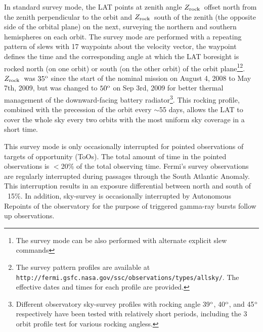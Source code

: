 \documentclass[aps,twocolumn,prd,superscriptaddress,showpacs,nofootinbib,fixfloat]{revtex4}
\newcommand{\degree}{^{\rm o}}
\newcommand{\zrock}{$Z_{\rm rock}$}
\begin{document}
In standard survey mode, the LAT points at zenith angle
\zrock\ offset north from the zenith perpendicular to the
orbit and \zrock\ south of the zenith (the opposite side of
the orbital plane) on the next, surveying the northern and
southern hemispheres on each orbit. The survey mode are
performed with a repeating pattern of slews with 17
waypoints about the velocity vector, the waypoint defines
the time and the corresponding angle at which the LAT
boresight is rocked north (on one orbit) or south (on the
other orbit) of the orbit plane\footnote{The survey mode can
be also performed with alternate explicit slew
commands}\footnote{The survey pattern profiles are available
at
\texttt{http://fermi.gsfc.nasa.gov/ssc/observations/types/allsky/}.
The effective dates and times for each profile are
provided. }. \zrock\ was $35\degree$ since the start of the
nominal mission on August 4, 2008 to May 7th, 2009, but was
changed to $50\degree$ on Sep 3rd, 2009 for better thermal
management of the downward-facing battery
radiator\footnote{Different observatory sky-survey profiles
with rocking angle 39$\degree$, 40$\degree$, and 45$\degree$
respectively have been tested with relatively short periods,
including the 3 orbit profile test for various rocking
angless.}. This rocking profile, combined with the
precession of the orbit every $\sim$55 days, allows the LAT
to cover the whole sky every two orbits with the most
uniform sky coverage in a short time.


This survey mode is only occasionally interrupted for
pointed observations of targets of opportunity (ToOs). The
total amount of time in the pointed observations is $<$20\%
of the total observing time. Fermi's survey observations are
regularly interrupted during passages through the South
Atlantic Anomaly. This interruption results in an exposure
differential between north and south of ~15\%. In addition,
sky-survey is occasionally interrupted by Autonomous
Repoints of the observatory for the purpose of triggered
gamma-ray bursts follow up observations.
\end{document}
